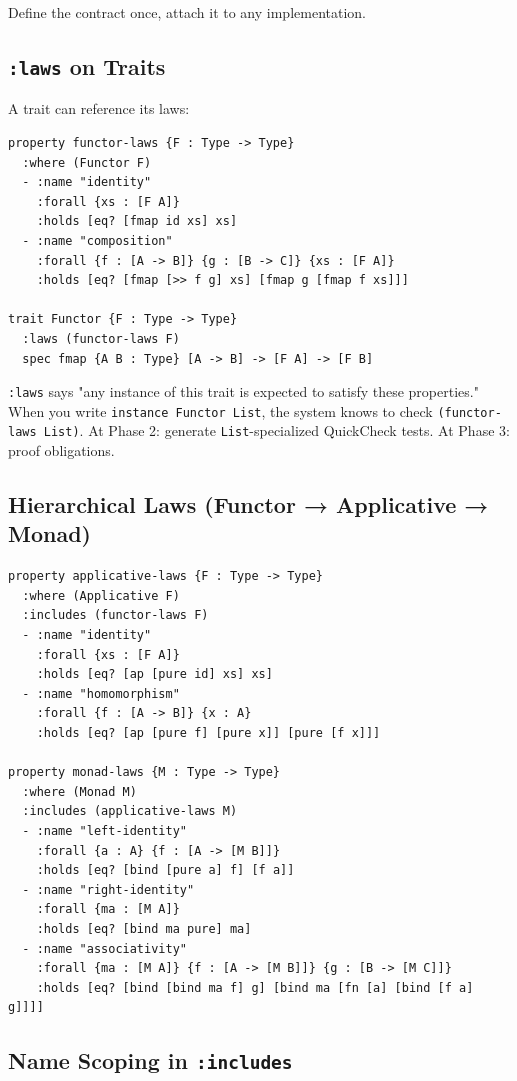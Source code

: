 \documentclass[11pt]{article}
\begin{document}
Define the contract once, attach it to any implementation.
\subsection{\texttt{:laws} on Traits}
\label{sec:org2a67970}

A trait can reference its laws:

\begin{verbatim}
property functor-laws {F : Type -> Type}
  :where (Functor F)
  - :name "identity"
    :forall {xs : [F A]}
    :holds [eq? [fmap id xs] xs]
  - :name "composition"
    :forall {f : [A -> B]} {g : [B -> C]} {xs : [F A]}
    :holds [eq? [fmap [>> f g] xs] [fmap g [fmap f xs]]]

trait Functor {F : Type -> Type}
  :laws (functor-laws F)
  spec fmap {A B : Type} [A -> B] -> [F A] -> [F B]
\end{verbatim}

\texttt{:laws} says "any instance of this trait is expected to satisfy these
properties." When you write \texttt{instance Functor List}, the system knows to check
\texttt{(functor-laws List)}. At Phase 2: generate \texttt{List}-specialized QuickCheck tests.
At Phase 3: proof obligations.
\subsection{Hierarchical Laws (Functor → Applicative → Monad)}
\label{sec:org56b910a}

\begin{verbatim}
property applicative-laws {F : Type -> Type}
  :where (Applicative F)
  :includes (functor-laws F)
  - :name "identity"
    :forall {xs : [F A]}
    :holds [eq? [ap [pure id] xs] xs]
  - :name "homomorphism"
    :forall {f : [A -> B]} {x : A}
    :holds [eq? [ap [pure f] [pure x]] [pure [f x]]]

property monad-laws {M : Type -> Type}
  :where (Monad M)
  :includes (applicative-laws M)
  - :name "left-identity"
    :forall {a : A} {f : [A -> [M B]]}
    :holds [eq? [bind [pure a] f] [f a]]
  - :name "right-identity"
    :forall {ma : [M A]}
    :holds [eq? [bind ma pure] ma]
  - :name "associativity"
    :forall {ma : [M A]} {f : [A -> [M B]]} {g : [B -> [M C]]}
    :holds [eq? [bind [bind ma f] g] [bind ma [fn [a] [bind [f a] g]]]]
\end{verbatim}
\subsection{Name Scoping in \texttt{:includes}}
\label{sec:orgef070df}
\end{document}
